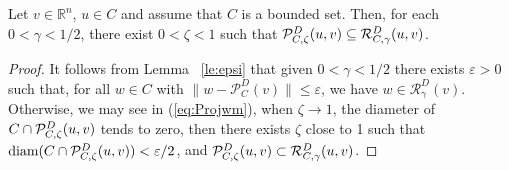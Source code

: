 \begin{proposition} \label{le:pcr}
	Let $v \in {\mathbb R}^n$, $u \in C$ and assume that $C$ is a bounded set. Then, for each $0<\gamma < 1/2$,     there exist $0 < \zeta  <1$ such that    ${\cal P}_{C,\zeta}^{D}(u, v)  \subseteq    {\cal R}_{C,\gamma}^{D}(u, v)$.
\end{proposition}
\begin{proof}
	It follows from Lemma~ \ref{le:epsi}  that given $0<\gamma<1/2$ there exists $\varepsilon>0$ such that,  for all $w\in C$  with $\|w-\mathcal{P}_C^D(v)\|\leq \varepsilon$, we have  $w\in\mathcal{R}_\gamma^D(v)$. Otherwise,  we may see in (\ref{eq:Projwm}), when $\zeta\to 1$, the diameter of $C\cap{\cal P}_{C,\zeta}^{D}(u, v)$ tends to zero, then there exists  $\zeta$ close to 1 such that $\mbox{diam}(C\cap{\cal P}_{C,\zeta}^{D}(u, v))<\varepsilon/2$, and ${\cal P}_{C,\zeta}^{D}(u, v) \subset {\cal R}_{C,\gamma}^{D}(u, v)$.
\end{proof}

